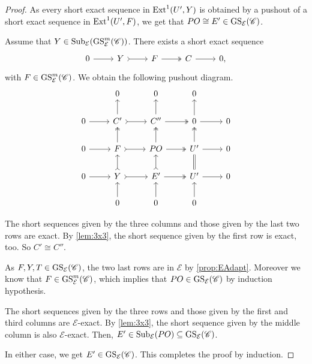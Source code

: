 \begin{proof}
As every short exact sequence in $\operatorname{Ext}^1(U',Y)$ is obtained by a pushout of a short exact sequence in $\operatorname{Ext}^1(U',F)$, we get that $PO \cong E' \in \operatorname{GS}_{\mathcal{E}}(\mathscr{C})$.

\bigskip

Assume that  $Y \in \operatorname{Sub}_\mathcal{E}(\operatorname{GS}^{m}_{\mathcal{E}}(\mathscr{C}))$. There exists a short exact sequence \[\begin{tikzcd}
	0 & Y & F  & C&  0,
	\arrow[from=1-1, to=1-2]
	\arrow[tail, from=1-2, to=1-3]
	\arrow[two heads,from=1-3, to=1-4]
	\arrow[from=1-4, to=1-5]
\end{tikzcd} \] with $F \in \operatorname{GS}^{m}_{\mathcal{E}}(\mathscr{C})$. We obtain the following pushout diagram.
\[\begin{tikzcd}
         & 0 & 0 & 0 &  \\
	0 & C' & C''  & 0 &  0 \\
     0 & F & PO & U' & 0 \\
      0 & Y & E' & U' & 0 \\
       & 0 & 0 & 0 & 
	\arrow[from=2-1, to=2-2]
	\arrow[tail, from=2-2, to=2-3]
	\arrow[two heads,from=2-3, to=2-4]
	\arrow[from=2-4, to=2-5]
        \arrow[from=3-1, to=3-2]
	\arrow[tail, from=3-2, to=3-3]
	\arrow[two heads,from=3-3, to=3-4]
	\arrow[from=3-4, to=3-5]
        \arrow[from=4-1, to=4-2]
	\arrow[tail, from=4-2, to=4-3]
	\arrow[two heads,from=4-3, to=4-4]
	\arrow[from=4-4, to=4-5]
        \arrow[from=5-2, to=4-2]
	\arrow[tail, from=4-2, to=3-2]
	\arrow[two heads,from=3-2, to=2-2]
	\arrow[from=2-2, to=1-2]
        \arrow[from=5-3, to=4-3]
	\arrow[tail, from=4-3, to=3-3]
	\arrow[two heads,from=3-3, to=2-3]
	\arrow[from=2-3, to=1-3]
        \arrow[from=5-4, to=4-4]
	\arrow[equals, from=4-4, to=3-4]
	\arrow[two heads,from=3-4, to=2-4]
	\arrow[from=2-4, to=1-4]
\end{tikzcd} \]

The short sequences given by the three columns and those given by the last two rows are exact. By \cref{lem:3x3}, the short sequence given by the first row is exact, too. So $C' \cong C''$.

As $F,Y,T \in \operatorname{GS}_{\mathcal{E}}(\mathscr{C})$, the two last rows are in $\mathcal{E}$ by \cref{prop:EAdapt}. Moreover we know that $F \in \operatorname{GS}^{m}_{\mathcal{E}}(\mathscr{C})$, which implies that $PO \in \operatorname{GS}_{\mathcal{E}}(\mathscr{C})$ by induction hypothesis.

The short sequences given by the three rows and those given by the first and third columns are $\mathcal{E}$-exact. By \cref{lem:3x3}, the short sequence given by the middle column is also $\mathcal{E}$-exact. Then, $E' \in \operatorname{Sub}_\mathcal{E}(PO) \subseteq \operatorname{GS}_{\mathcal{E}}(\mathscr{C})$. 

In either case, we get $E' \in \operatorname{GS}_\mathcal{E}(\mathscr{C})$. This completes the proof by induction.
\end{proof}

